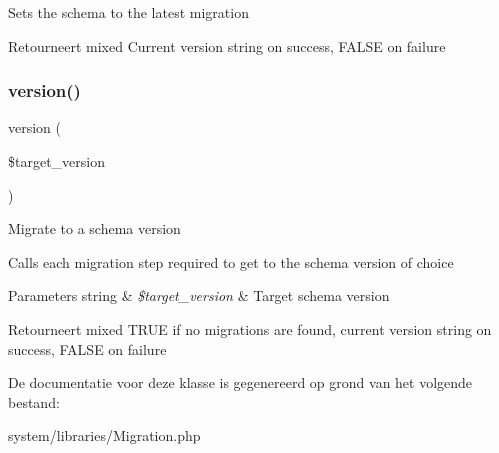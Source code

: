 Sets the schema to the latest migration

\begin{DoxyReturn}{Retourneert}
mixed Current version string on success, F\+A\+L\+SE on failure 
\end{DoxyReturn}
\mbox{\label{class_c_i___migration_a9192bce789e541754ba481dfec6bb39a}} 
\subsubsection{\texorpdfstring{version()}{version()}}
{\footnotesize\ttfamily version (\begin{DoxyParamCaption}\item[{}]{\$target\+\_\+version }\end{DoxyParamCaption})}

Migrate to a schema version

Calls each migration step required to get to the schema version of choice


\begin{DoxyParams}[1]{Parameters}
string & {\em \$target\+\_\+version} & Target schema version \\
\hline
\end{DoxyParams}
\begin{DoxyReturn}{Retourneert}
mixed T\+R\+UE if no migrations are found, current version string on success, F\+A\+L\+SE on failure 
\end{DoxyReturn}


De documentatie voor deze klasse is gegenereerd op grond van het volgende bestand\+:\begin{DoxyCompactItemize}
\item 
system/libraries/Migration.\+php\end{DoxyCompactItemize}
